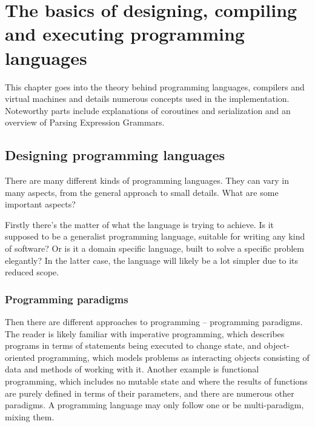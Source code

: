 \chapter{The basics of designing, compiling and executing programming languages}


This chapter goes into the theory behind programming languages, compilers and virtual machines and details numerous concepts used in the implementation. Noteworthy parts include explanations of coroutines and serialization and an overview of Parsing Expression Grammars.

    \section{Designing programming languages}
    
		
		There are many different kinds of programming languages. They can vary in many aspects, from the general approach to small details. What are some important aspects?
		
		Firstly there's the matter of what the language is trying to achieve. Is it supposed to be a generalist programming language, suitable for writing any kind of software? Or is it a domain specific language, built to solve a specific problem elegantly? In the latter case, the language will likely be a lot simpler due to its reduced scope.
		
		\subsection{Programming paradigms}
		Then there are different approaches to programming -- programming paradigms. The reader is likely familiar with imperative programming, which describes programs in terms of statements being executed to change state, and object-oriented programming, which models problems as interacting objects consisting of data and methods of working with it. Another example is functional programming, which includes no mutable state and where the results of functions are purely defined in terms of their parameters, and there are numerous other paradigms. A programming language may only follow one or be multi-paradigm, mixing them.
		
